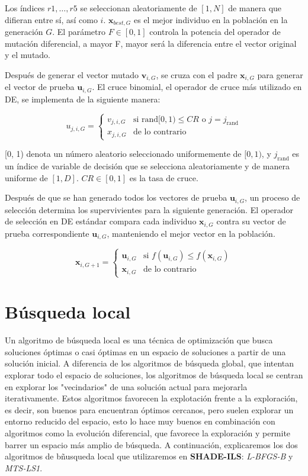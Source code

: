 Los índices \( r1, \ldots, r5 \) se seleccionan aleatoriamente de \([1, N]\) de manera que difieran entre sí, así como \( i \). \( \mathbf{x}_{best,G} \) es el mejor individuo en la población en la generación \( G \). El parámetro \( F \in [0, 1] \) controla la potencia del operador de mutación diferencial, a mayor F, mayor será la diferencia entre el vector original y el mutado.

Después de generar el vector mutado \( \mathbf{v}_{i,G} \), se cruza con el padre \( \mathbf{x}_{i,G} \) para generar el vector de prueba \( \mathbf{u}_{i,G} \). El cruce binomial, el operador de cruce más utilizado en DE, se implementa de la siguiente manera:

\[
u_{j,i,G} =
\begin{cases}
v_{j,i,G} & \text{si } \text{rand}[0, 1) \leq CR \text{ o } j = j_{\text{rand}} \\
x_{j,i,G} & \text{de lo contrario}
\end{cases}
\]

[0, 1) denota un número aleatorio seleccionado uniformemente de \([0, 1)\), y \( j_{\text{rand}} \) es un índice de variable de decisión que se selecciona aleatoriamente y de manera uniforme de \([1, D]\). \( CR \in [0, 1] \) es la tasa de cruce.

Después de que se han generado todos los vectores de prueba \( \mathbf{u}_{i,G} \), un proceso de selección determina los supervivientes para la siguiente generación. El operador de selección en DE estándar compara cada individuo \( \mathbf{x}_{i,G} \) contra su vector de prueba correspondiente \( \mathbf{u}_{i,G} \), manteniendo el mejor vector en la población.

\[
\mathbf{x}_{i,G+1} = 
\begin{cases} 
\mathbf{u}_{i,G} & \text{si } f(\mathbf{u}_{i,G}) \leq f(\mathbf{x}_{i,G}) \\ 
\mathbf{x}_{i,G} & \text{de lo contrario} 
\end{cases} 
\]

\section{Búsqueda local}

Un algoritmo de búsqueda local es una técnica de optimización que busca soluciones óptimas o casi óptimas en un espacio de soluciones a partir de una solución inicial. A diferencia de los algoritmos de búsqueda global, que intentan explorar todo el espacio de soluciones, los algoritmos de búsqueda local se centran en explorar los "vecindarios" de una solución actual para mejorarla iterativamente. Estos algoritmos favorecen la explotación frente a la exploración, es decir, son buenos para encuentran óptimos cercanos, pero suelen explorar un entorno reducido del espacio, esto lo hace muy buenos en combinación con algoritmos como la evolución diferencial, que favorece la exploración y permite barrer un espacio más amplio de búsqueda. A continuación, explicaremos los dos algoritmos de bñusqueda local que utilizaremos en \textbf{SHADE-ILS}: \textit{L-BFGS-B} y \textit{MTS-LS1}.

